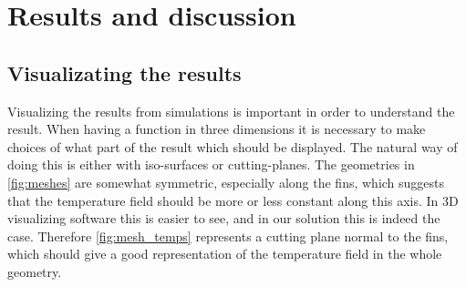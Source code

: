 \section{Results and discussion}



\subsection{Visualizating the results}
Visualizing the results from simulations is important in order to understand the result. When having a function in three dimensions it is necessary to make choices of what part of the result which should be displayed. The natural way of doing this is either with iso-surfaces or cutting-planes. The geometries in \cref{fig:meshes} are somewhat symmetric, especially along the fins, which suggests that the temperature field should be more or less constant along this axis. In 3D visualizing software this is easier to see, and in our solution this is indeed the case. Therefore \cref{fig:mesh_temps} represents a cutting plane normal to the fins, which should give a good representation of the temperature field in the whole geometry.

